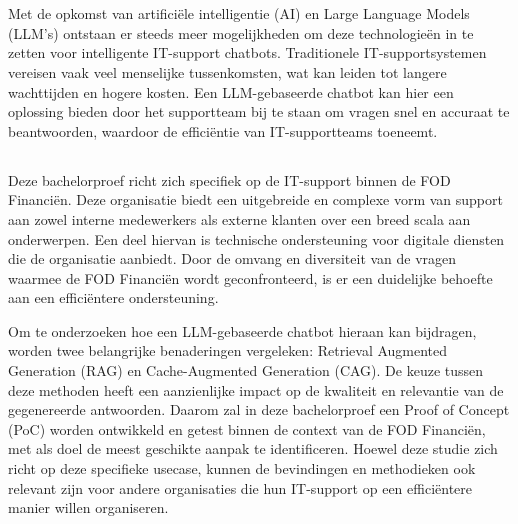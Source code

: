 
\chapter{}%
\label{ch:inleiding}

Met de opkomst van artificiële intelligentie (AI) en Large Language Models (LLM’s) ontstaan er steeds meer mogelijkheden om deze technologieën in te zetten voor intelligente IT-support chatbots. Traditionele IT-supportsystemen vereisen vaak veel menselijke tussenkomsten, wat kan leiden tot langere wachttijden en hogere kosten. Een LLM-gebaseerde chatbot kan hier een oplossing bieden door het supportteam bij te staan om vragen snel en accuraat te beantwoorden, waardoor de efficiëntie van IT-supportteams toeneemt.

\section{}%
\label{sec:probleemstelling}

Deze bachelorproef richt zich specifiek op de IT-support binnen de FOD Financiën. Deze organisatie biedt een uitgebreide en complexe vorm van support aan zowel interne medewerkers als externe klanten over een breed scala aan onderwerpen. Een deel hiervan is technische ondersteuning voor digitale diensten die de organisatie aanbiedt. Door de omvang en diversiteit van de vragen waarmee de FOD Financiën wordt geconfronteerd, is er een duidelijke behoefte aan een efficiëntere ondersteuning.

Om te onderzoeken hoe een LLM-gebaseerde chatbot hieraan kan bijdragen, worden twee belangrijke benaderingen vergeleken: Retrieval Augmented Generation (RAG) en Cache-Augmented Generation (CAG). De keuze tussen deze methoden heeft een aanzienlijke impact op de kwaliteit en relevantie van de gegenereerde antwoorden. Daarom zal in deze bachelorproef een Proof of Concept (PoC) worden ontwikkeld en getest binnen de context van de FOD Financiën, met als doel de meest geschikte aanpak te identificeren. Hoewel deze studie zich richt op deze specifieke usecase, kunnen de bevindingen en methodieken ook relevant zijn voor andere organisaties die hun IT-support op een efficiëntere manier willen organiseren.

